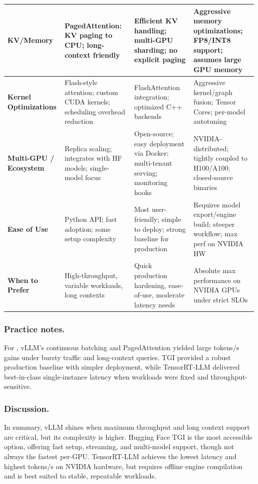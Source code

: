 {\begin{xltabular}{\linewidth}{@{}>{\raggedright\arraybackslash}p{3.0cm}>{\raggedright\arraybackslash}X>{\raggedright\arraybackslash}X>{\raggedright\arraybackslash}X@{}}
    \midrule
    \textbf{KV/Memory} 
    & PagedAttention: KV paging to CPU; long-context friendly 
    & Efficient KV handling; multi-GPU sharding; no explicit paging 
    & Aggressive memory optimizations; FP8/INT8 support; assumes large GPU memory \\
    \midrule
    \textbf{Kernel Optimizations} 
    & Flash-style attention; custom CUDA kernels; scheduling overhead reduction 
    & FlashAttention integration; optimized C++ backends 
    & Aggressive kernel/graph fusion; Tensor Cores; per-model autotuning \\
    \midrule
    \textbf{Multi-GPU / Ecosystem} 
    & Replica scaling; integrates with HF models; single-model focus 
    & Open-source; easy deployment via Docker; multi-tenant serving; monitoring hooks 
    & NVIDIA-distributed; tightly coupled to H100/A100; closed-source binaries \\
    \midrule
    \textbf{Ease of Use} 
    & Python API; fast adoption; some setup complexity 
    & Most user-friendly; simple to deploy; strong baseline for production 
    & Requires model export/engine build; steeper workflow; max perf on NVIDIA HW \\
    \midrule
    \textbf{When to Prefer} 
    & High-throughput, variable workloads, long contexts 
    & Quick production hardening, ease-of-use, moderate latency needs 
    & Absolute max performance on NVIDIA GPUs under strict SLOs \\
  \end{xltabular}
}

\subsubsection{Practice notes.}  
For \ishtar{}, vLLM’s continuous batching and PagedAttention yielded large tokens/s gains under bursty traffic and long-context queries. TGI provided a robust production baseline with simpler deployment, while TensorRT-LLM delivered best-in-class single-instance latency when workloads were fixed and throughput-sensitive.

\subsubsection{Discussion.}  
In summary, vLLM \cite{Kwon2023vLLM} shines when maximum throughput and long context support are critical, but its complexity is higher. Hugging Face TGI \cite{tgi_docs} is the most accessible option, offering fast setup, streaming, and multi-model support, though not always the fastest per-GPU. TensorRT-LLM \cite{tensorrt_llm_docs} achieves the lowest latency and highest tokens/s on NVIDIA hardware, but requires offline engine compilation and is best suited to stable, repeatable workloads.

